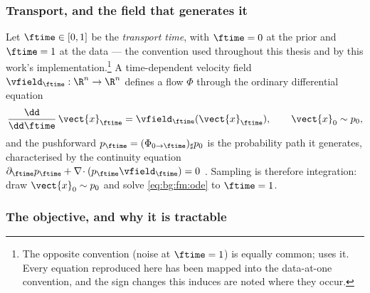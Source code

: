 \subsubsection*{Transport, and the field that generates it}

Let $\ftime \in [0,1]$ be the \emph{transport time}, with $\ftime = 0$ at the prior and
$\ftime = 1$ at the data --- the convention used throughout this thesis and by this work's
implementation.\footnote{The opposite convention (noise at $\ftime=1$) is equally common;
\parencite{geng2025meanflow} uses it. Every equation reproduced here has been mapped into the
data-at-one convention, and the sign changes this induces are noted where they occur.}
A time-dependent velocity field $\vfield_{\ftime}:\R^{n}\to\R^{n}$ defines a flow
$\Phi$ through the ordinary differential equation
\begin{equation}\label{eq:bg:fm:ode}
  \frac{\dd}{\dd\ftime}\,\vect{x}_{\ftime} = \vfield_{\ftime}(\vect{x}_{\ftime}),
  \qquad \vect{x}_{0} \sim p_{0},
\end{equation}
and the pushforward $p_{\ftime} = (\Phi_{0\to\ftime})_{\sharp}p_{0}$ is the probability path
it generates, characterised by the continuity equation
$\partial_{\ftime}p_{\ftime} + \nabla\!\cdot(p_{\ftime}\vfield_{\ftime}) = 0$
\parencite[Sec.~2]{lipman2023flow}. Sampling is therefore integration: draw $\vect{x}_{0}\sim p_{0}$ and
solve \eqref{eq:bg:fm:ode} to $\ftime = 1$.

\subsubsection*{The objective, and why it is tractable}


